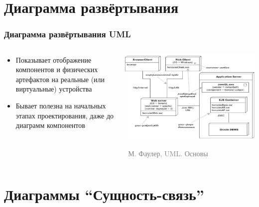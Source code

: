 \documentclass[xetex,mathserif,serif]{beamer}
\newcommand{\attribution}[1] {
	\vspace{-5mm}\begin{flushright}\begin{scriptsize}\textcolor{gray}{\textcopyright\, #1}\end{scriptsize}\end{flushright}
}
\begin{document}
	\section{Диаграмма развёртывания}
	
	\begin{frame}
		\frametitle{Диаграмма развёртывания UML}
		\begin{columns}
			\begin{column}{0.5\textwidth}
				\begin{itemize}
					\item Показывает отображение компонентов и физических артефактов на реальные (или виртуальные) устройства
					\item Бывает полезна на начальных этапах проектирования, даже до диаграмм компонентов
				\end{itemize}
			\end{column}
			\begin{column}{0.5\textwidth}
				\begin{center}
					\includegraphics[width=\textwidth]{deploymentDiagram.png}
					\attribution{М. Фаулер, UML. Основы}
				\end{center}
			\end{column}
		\end{columns}
	\end{frame}

	\section{Диаграммы ``Сущность-связь''}
\end{document}
